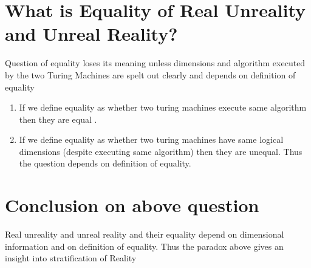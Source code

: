 \documentclass[11pt,onecolumn]{article}
\begin{document}
\section{What is Equality of Real Unreality and Unreal Reality?}

Question of equality loses its meaning unless dimensions and algorithm executed by the two Turing Machines are spelt out clearly and depends on definition of equality
\begin{enumerate}
\item If we define equality as whether two turing machines execute same algorithm then they are equal .
\item If we define equality as whether two turing machines have same logical dimensions (despite executing same algorithm) then they are unequal. Thus the question depends on definition of equality. 
\end{enumerate}

\section{Conclusion on above question}

Real unreality and unreal reality and their equality depend on dimensional information and on definition of equality. Thus the paradox above gives an insight into stratification of Reality
\end{document}
